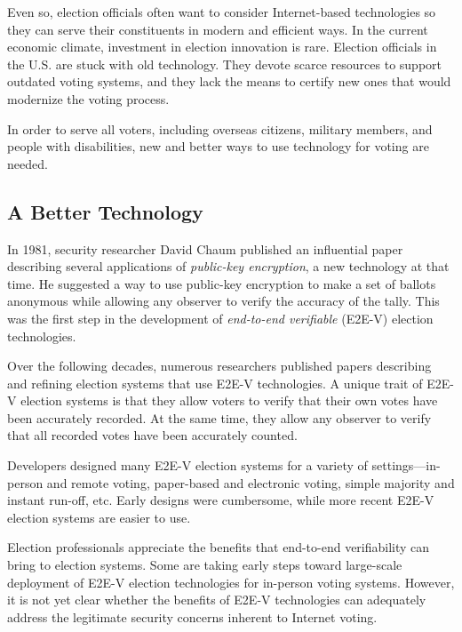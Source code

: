 Even so, election officials often want to consider Internet-based
technologies so they can serve their constituents in modern and
efficient ways. In the current economic climate, investment in
election innovation is rare. Election officials in the U.S. are stuck
with old technology. They devote scarce resources to support outdated
voting systems, and they lack the means to certify new ones that would
modernize the voting process.

In order to serve all voters, including overseas citizens, military
members, and people with disabilities, new and better ways to use
technology for voting are needed.

\subsection*{A Better Technology}
\label{sec:better-technology}

In 1981, security researcher David Chaum published an influential
paper describing several applications of \emph{public-key encryption},
a new technology at that time. He suggested a way to use public-key
encryption to make a set of ballots anonymous while allowing any
observer to verify the accuracy of the tally. This was the first step
in the development of \emph{end-to-end verifiable} (E2E-V) election
technologies.

Over the following decades, numerous researchers published papers
describing and refining election systems that use E2E-V
technologies. A unique trait of E2E-V election systems is that they
allow voters to verify that their own votes have been accurately
recorded. At the same time, they allow any observer to verify that all
recorded votes have been accurately counted.

Developers designed many E2E-V election systems for a variety of
settings---in-person and remote voting, paper-based and electronic
voting, simple majority and instant run-off, etc. Early designs were
cumbersome, while more recent E2E-V election systems are easier to
use.

Election professionals appreciate the benefits that end-to-end
verifiability can bring to election systems. Some are taking early
steps toward large-scale deployment of E2E-V election technologies for
in-person voting systems. However, it is not yet clear whether the
benefits of E2E-V technologies can adequately address the legitimate
security concerns inherent to Internet voting.

